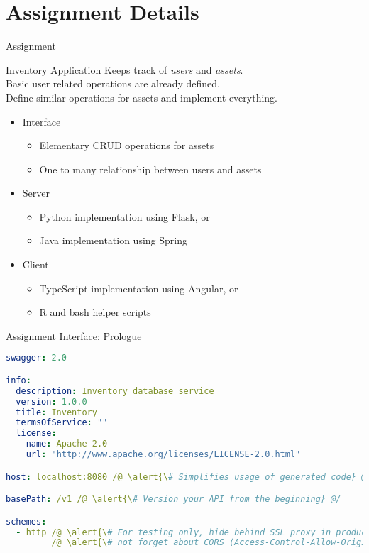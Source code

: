 \section{Assignment Details}


\begin{frame}{Assignment}
    \begin{block}{Inventory Application}
        Keeps track of \emph{users} and \emph{assets}. \\
        Basic user related operations are already defined. \\
        Define similar operations for assets and implement everything.
    \end{block}

    \begin{itemize}
        \item Interface
        \begin{itemize}
            \item Elementary CRUD operations for assets
            \item One to many relationship between users and assets
        \end{itemize}
        \item Server
        \begin{itemize}
            \item Python implementation using Flask, or
            \item Java implementation using Spring
        \end{itemize}
        \item Client
        \begin{itemize}
            \item TypeScript implementation using Angular, or
            \item R and bash helper scripts
        \end{itemize}
    \end{itemize}
\end{frame}


\begin{frame}[fragile]{Assignment Interface: Prologue}
\begin{lstlisting}[language=yaml,style=mini]
swagger: 2.0

info:
  description: Inventory database service
  version: 1.0.0
  title: Inventory
  termsOfService: ""
  license:
    name: Apache 2.0
    url: "http://www.apache.org/licenses/LICENSE-2.0.html"

host: localhost:8080 /@ \alert{\# Simplifies usage of generated code} @/

basePath: /v1 /@ \alert{\# Version your API from the beginning} @/

schemes:
  - http /@ \alert{\# For testing only, hide behind SSL proxy in production (and do} @/
         /@ \alert{\# not forget about CORS (Access-Control-Allow-Origin) etc.)} @/
\end{lstlisting}
\end{frame}



